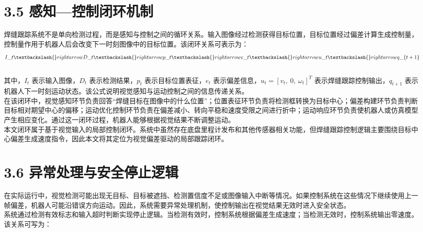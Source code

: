 \documentclass[UTF8,a4paper,12pt]{ctexrep}
\begin{document}
\section{3.5 感知—控制闭环机制}

焊缝跟踪系统不是单向检测过程，而是感知与控制之间的循环关系。输入图像经过检测获得目标位置，目标位置经过偏差计算生成控制量，控制量作用于机器人后会改变下一时刻图像中的目标位置。该闭环关系可表示为：\\

$$\\
I\_t \textbackslash\{\}rightarrow D\_t \textbackslash\{\}rightarrow p\_t \textbackslash\{\}rightarrow e\_t \textbackslash\{\}rightarrow u\_t \textbackslash\{\}rightarrow q\_\{t+1\}\\
$$\\

其中，$I_t$ 表示输入图像，$D_t$ 表示检测结果，$p_t$ 表示目标位置表征，$e_t$ 表示偏差信息，$u_t=[v_t,\ 0,\ \omega_t]^T$ 表示焊缝跟踪控制输出，$q_{t+1}$ 表示机器人下一时刻运动状态。该公式说明视觉感知与运动控制之间的信息传递关系。\\

在该闭环中，视觉感知环节负责回答“焊缝目标在图像中的什么位置”；位置表征环节负责将检测框转换为目标中心；偏差构建环节负责判断目标相对期望中心的偏移；运动优化控制环节负责在偏差减小、转向平稳和速度受限之间进行折中；运动响应环节负责使机器人或仿真模型产生相应变化。通过这一闭环过程，机器人能够根据视觉结果不断调整运动。\\

本文闭环属于基于视觉输入的局部控制闭环。系统中虽然存在底盘里程计发布和其他传感器相关功能，但焊缝跟踪控制逻辑主要围绕目标中心偏差生成速度指令，因此本文将其定位为视觉偏差驱动的局部跟踪闭环。\\

\section{3.6 异常处理与安全停止逻辑}

在实际运行中，视觉检测可能出现无目标、目标被遮挡、检测置信度不足或图像输入中断等情况。如果控制系统在这些情况下继续使用上一帧偏差，机器人可能沿错误方向运动。因此，系统需要异常处理机制，使控制输出在视觉结果无效时进入安全状态。\\

系统通过检测有效标志和输入超时判断实现停止逻辑。当检测有效时，控制系统根据偏差生成速度；当检测无效时，控制系统输出零速度。该关系可写为：\\
\end{document}
